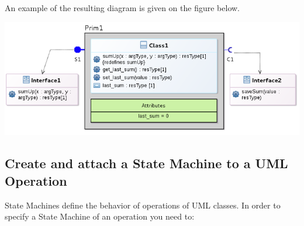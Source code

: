 \documentclass[12pt]{article}
\begin{document}
An example of the resulting diagram is given on the figure below.

     \centerline{
     \includegraphics[width=14cm]{draws/prim-attr.png}
     \label{fig:vce-proj}
     }
     
\subsection{Create and attach a State Machine to a UML Operation}

State Machines define the behavior of operations of UML classes. In order to specify a State Machine of an operation you need to:
\end{document}
